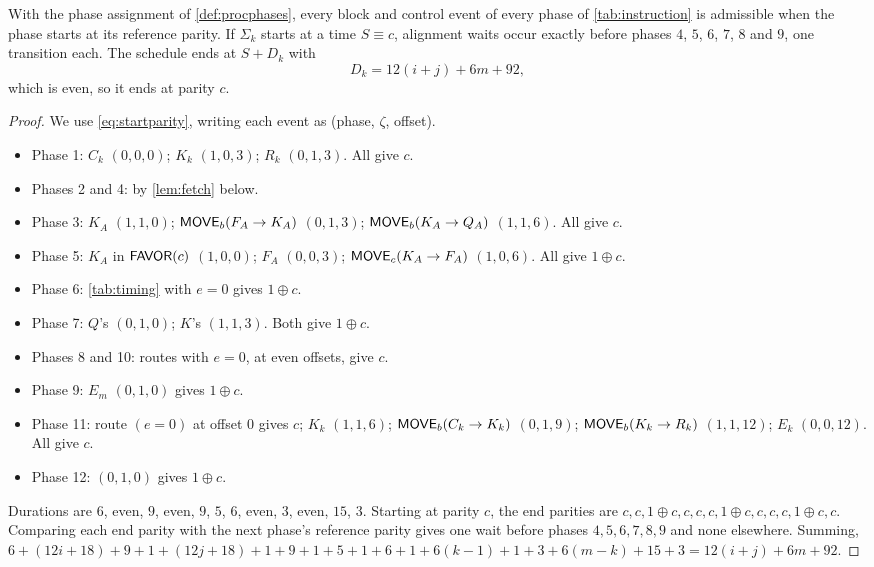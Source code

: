 \begin{lemma}\label{lem:sigmatiming}
With the phase assignment of \cref{def:procphases}, every block and control event of every phase of
\cref{tab:instruction} is admissible when the phase starts at its reference parity. If $\Sigma_k$
starts at a time $S\equiv c$, alignment waits occur exactly before phases $4$, $5$, $6$, $7$, $8$
and $9$, one transition each. The schedule ends at $S+D_k$ with
\[
D_k=12(i+j)+6m+92,
\]
which is even, so it ends at parity $c$.
\end{lemma}

\begin{proof}
We use \eqref{eq:startparity}, writing each event as (phase, $\zeta$, offset).
\begin{itemize}
\item Phase 1: $C_k$ $(0,0,0)$; $K_k$ $(1,0,3)$; $R_k$ $(0,1,3)$. All give $c$.
\item Phases 2 and 4: by \cref{lem:fetch} below.
\item Phase 3: $K_A$ $(1,1,0)$; $\textsf{MOVE}_b(F_A\to K_A)$ $(0,1,3)$; $\textsf{MOVE}_b(K_A\to Q_A)$
  $(1,1,6)$. All give $c$.
\item Phase 5: $K_A$ in $\textsf{FAVOR}(c)$ $(1,0,0)$; $F_A$ $(0,0,3)$; $\textsf{MOVE}_c(K_A\to F_A)$ $(1,0,6)$. All
  give $1\oplus c$.
\item Phase 6: \cref{tab:timing} with $e=0$ gives $1\oplus c$.
\item Phase 7: $Q$'s $(0,1,0)$; $K$'s $(1,1,3)$. Both give $1\oplus c$.
\item Phases 8 and 10: routes with $e=0$, at even offsets, give $c$.
\item Phase 9: $E_m$ $(0,1,0)$ gives $1\oplus c$.
\item Phase 11: route $(e=0)$ at offset $0$ gives $c$; $K_k$ $(1,1,6)$; $\textsf{MOVE}_b(C_k\to K_k)$
  $(0,1,9)$; $\textsf{MOVE}_b(K_k\to R_k)$ $(1,1,12)$; $E_k$ $(0,0,12)$. All give $c$.
\item Phase 12: $(0,1,0)$ gives $1\oplus c$.
\end{itemize}
Durations are $6$, even, $9$, even, $9$, $5$, $6$, even, $3$, even, $15$, $3$. Starting at parity
$c$, the end parities are $c,c,1{\oplus}c,c,c,c,1{\oplus}c,c,c,c,1{\oplus}c,c$. Comparing each end
parity with the next phase's reference parity gives one wait before phases $4,5,6,7,8,9$ and none
elsewhere. Summing,
$6+(12i+18)+9+1+(12j+18)+1+9+1+5+1+6+1+6(k-1)+1+3+6(m-k)+15+3=12(i+j)+6m+92$.
\end{proof}

